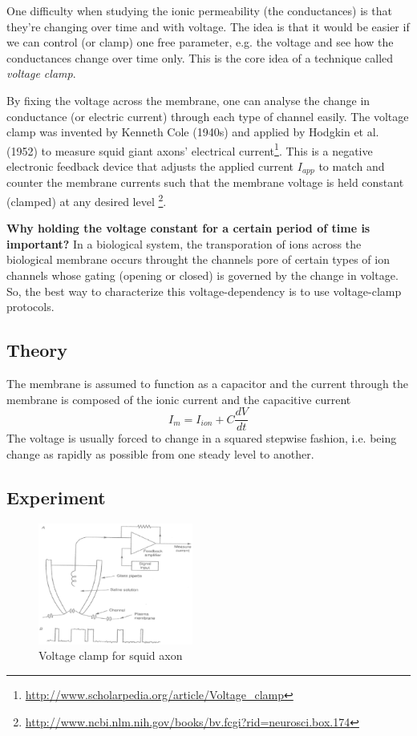 One difficulty when studying the ionic permeability (the conductances)
is that they're changing over time and with voltage. The idea is that
it would be easier if we can control (or clamp) one free parameter,
e.g. the voltage and see how the conductances change over time
only. This is the core idea of a technique called {\it voltage clamp}.

By fixing the voltage across the membrane, one can analyse the change
in conductance (or electric current) through each type of channel
easily. The voltage clamp was invented by Kenneth Cole (1940s) and
applied by Hodgkin et al. (1952) to measure squid giant axons'
electrical
current\footnote{\url{http://www.scholarpedia.org/article/Voltage_clamp}}.
This is a negative electronic feedback device that adjusts the applied
current $I_{app}$ to match and counter the membrane currents such that
the membrane voltage is held constant (clamped) at any desired level
\footnote{\url{http://www.ncbi.nlm.nih.gov/books/bv.fcgi?rid=neurosci.box.174}}.

{\bf Why holding the voltage constant for a certain period of time is
important?} In a biological system, the transporation of ions across the
biological membrane occurs throught the channels pore of certain types of ion
channels whose gating (opening or closed) is governed by the change in voltage.
So, the best way to characterize this voltage-dependency
is to use voltage-clamp protocols.

\subsection{Theory}
\label{sec:theory}

The membrane is assumed to function as a capacitor and the current
through the membrane is composed of the ionic current and the
capacitive current
\begin{equation}
  \label{eq:158}
  I_m = I_{ion} + C\frac{dV}{dt}
\end{equation}
The voltage is usually forced to change in a squared stepwise fashion,
i.e. being change as rapidly as possible from one steady level to
another.

\subsection{Experiment}
\label{sec:experiment}


\begin{figure}[htb]
  \centerline{\includegraphics[height=4cm]{./images/voltage_clamp.eps}}
  \caption{Voltage clamp for squid axon}\label{fig:voltage_clamp}
\end{figure}

